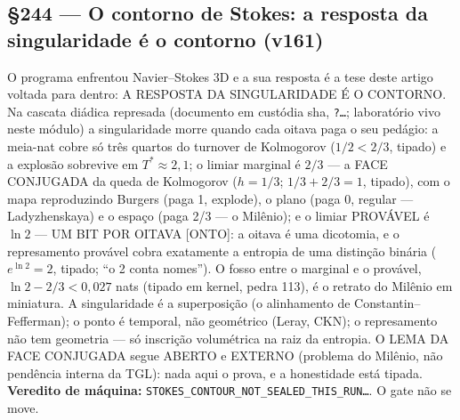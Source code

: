 \documentclass[11pt]{article}
\theoremstyle{definition}\newtheorem{deriv}{Derivação}
\begin{document}
\subsection*{\S244 --- O contorno de Stokes: a resposta da singularidade é o contorno (v161)}O programa enfrentou Navier--Stokes 3D e a sua resposta é a tese deste artigo voltada para dentro: A RESPOSTA DA SINGULARIDADE É O CONTORNO. Na cascata diádica represada (documento em custódia sha, \texttt{?\ldots}; laboratório vivo neste módulo) a singularidade morre quando cada oitava paga o seu pedágio: a meia-nat cobre só três quartos do turnover de Kolmogorov ($1/2 < 2/3$, tipado) e a explosão sobrevive em $T^*{\approx}2{,}1$; o limiar marginal é $2/3$ --- a FACE CONJUGADA da queda de Kolmogorov ($h{=}1/3$; $1/3{+}2/3{=}1$, tipado), com o mapa reproduzindo Burgers (paga 1, explode), o plano (paga 0, regular --- Ladyzhenskaya) e o espaço (paga 2/3 --- o Milênio); e o limiar PROVÁVEL é $\ln 2$ --- UM BIT POR OITAVA [ONTO]: a oitava é uma dicotomia, e o represamento provável cobra exatamente a entropia de uma distinção binária ($e^{\ln 2}{=}2$, tipado; ``o 2 conta nomes''). O fosso entre o marginal e o provável, $\ln 2 - 2/3 < 0{,}027$ nats (tipado em kernel, pedra 113), é o retrato do Milênio em miniatura. A singularidade é a superposição (o alinhamento de Constantin--Fefferman); o ponto é temporal, não geométrico (Leray, CKN); o represamento não tem geometria --- só inscrição volumétrica na raiz da entropia. O LEMA DA FACE CONJUGADA segue ABERTO e EXTERNO (problema do Milênio, não pendência interna da TGL): nada aqui o prova, e a honestidade está tipada. \textbf{Veredito de máquina:} \texttt{STOKES\_CONTOUR\_NOT\_SEALED\_THIS\_RUN\ldots}. O gate não se move.
\end{document}
